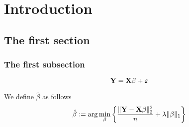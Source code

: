 \chapter{Introduction}
\section{The first section}
\subsection{The first subsection}

\begin{equation}
    \label{def: linear model (matrix)}
    \mathbf{Y} = \mathbf{X} \beta + \boldsymbol{\varepsilon}
\end{equation}

We define $\hat \beta$ as follows
\begin{equation}
    \label{not: beta hat}
    \hat{\beta}:=\arg \min _{\beta}\left\{\frac{\|\mathbf{Y}-\mathbf{X} \beta\|_{2}^{2}}{n}+\lambda\|\beta\|_{1}\right\}
\end{equation}


